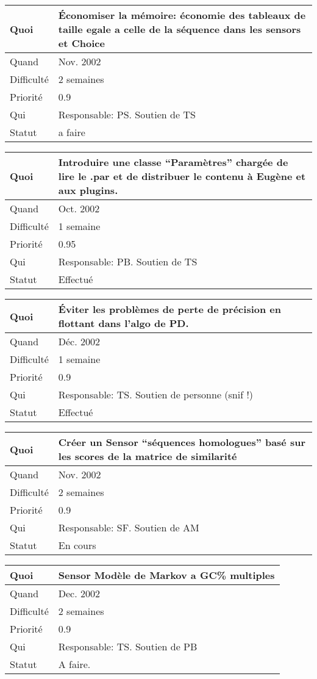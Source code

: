 \documentclass[a4paper,11pt]{article}
\begin{document}
\begin{longtable}{|l|p{7cm}|}\hline
  Quoi & \'Economiser la m\'emoire: \'economie des tableaux de taille egale a celle de la s\'equence dans les sensors et Choice \\\hline
  Quand  &  Nov. 2002\\\hline
  Difficult\'e &  2 semaines\\\hline
  Priorit\'e & 0.9 \\\hline
  Qui & Responsable: PS. Soutien de TS\\\hline
  Statut & a faire\\\hline
\end{longtable}

\begin{longtable}{|l|p{7cm}|}\hline
  Quoi & Introduire une classe ``Param\`etres'' charg\'ee de lire le .par
  et de distribuer le contenu \`a Eug\`ene et aux plugins.  \\\hline
  Quand  &  Oct. 2002 \\\hline
  Difficult\'e &  1 semaine \\\hline
  Priorit\'e &  0.95 \\\hline
  Qui & Responsable: PB. Soutien de TS\\\hline
  Statut & Effectu\'e\\\hline
\end{longtable}

\begin{longtable}{|l|p{7cm}|}\hline
  Quoi & \'Eviter les probl\`emes de perte de pr\'ecision en flottant dans
  l'algo de PD.\\\hline
  Quand  &  D\'ec. 2002\\\hline
  Difficult\'e & 1 semaine \\\hline
  Priorit\'e &  0.9 \\\hline
  Qui & Responsable: TS. Soutien de personne (snif !)\\\hline
  Statut & Effectu\'e\\\hline
\end{longtable}

\begin{longtable}{|l|p{7cm}|}\hline
  Quoi & Cr\'eer un Sensor ``s\'equences homologues'' bas\'e sur les scores
  de la matrice de similarit\'e \\\hline
  Quand  & Nov. 2002 \\\hline
  Difficult\'e &  2 semaines\\\hline
  Priorit\'e &  0.9 \\\hline
  Qui & Responsable: SF. Soutien de AM\\\hline
  Statut & En cours\\\hline
\end{longtable}

\begin{longtable}{|l|p{7cm}|}\hline
  Quoi & Sensor Mod\`ele de Markov a GC\% multiples\\\hline
  Quand  &  Dec. 2002 \\\hline
  Difficult\'e &  2 semaines \\\hline
  Priorit\'e &  0.9 \\\hline
  Qui & Responsable: TS. Soutien de PB\\\hline
  Statut & A faire.\\\hline
\end{longtable}
\end{document}

